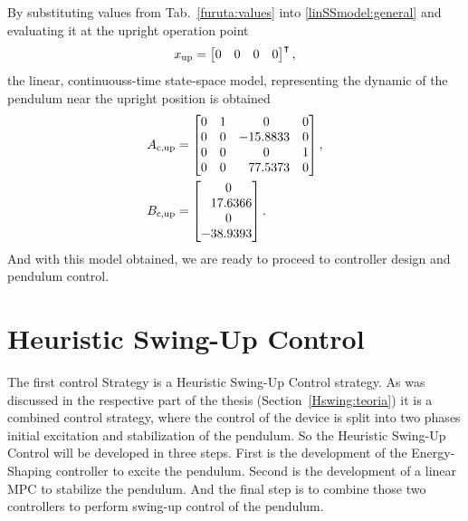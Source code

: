 By substituting values from Tab.~\ref{furuta:values} into \ref{linSSmodel:general} and evaluating it at the upright operation point 
\begin{equation}
x _{\text{up}} = \begin{bmatrix}0&0&0&0\end{bmatrix}^\intercal, 
\end{equation}
the linear, continuouss-time state-space model, representing the dynamic of the pendulum near the upright position is obtained
\begin{subequations}\label{linSSmodel:up}
	\begin{align}
	A _{\text{c,up}} &=\begin{bmatrix}
	0&1&\ 0& 0\\
	0&0&-15.8833&0\\
	0&0&\ 0&1\\
	0&0&\ \; \,77.5373&0
	\end{bmatrix},\\
	B _{\text{c,up}} &=\begin{bmatrix}
	\ 0\\
	\ \; \,17.6366\\
	\ 0\\
	-38.9393
	\end{bmatrix}.
	\end{align}
\end{subequations}
And with this model obtained, we are ready to proceed to controller design and pendulum control.
\section{Heuristic Swing-Up Control}
The first control Strategy is a Heuristic Swing-Up Control strategy. As was discussed in the respective part of the thesis (Section~\ref{Hswing:teoria}) it is a combined control strategy, where the control of the device is split into two phases initial excitation and stabilization of the pendulum. So the Heuristic Swing-Up Control will be developed in three steps. First is the development of the Energy-Shaping controller to excite the pendulum. Second is the development of a linear MPC to stabilize the pendulum. And the final step is to combine those two controllers to perform swing-up control of the pendulum.
